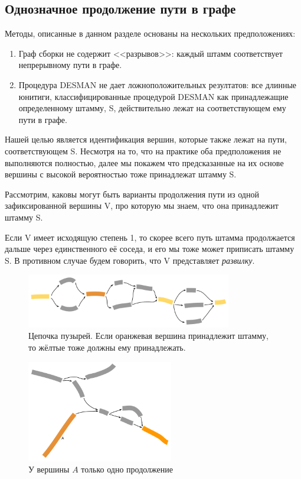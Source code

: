 \documentclass{spbau-diploma}
\begin{document}
\subsection{Однозначное продолжение пути в графе}
Методы, описанные в данном разделе основаны на нескольких предположениях: 
\begin{enumerate}
    \item Граф сборки не содержит <<разрывов>>: каждый штамм соответствует непрерывному пути в графе.
    \item Процедура DESMAN не дает ложноположительных резултатов: все длинные юнитиги, классифицированные процедурой DESMAN как принадлежащие определенному штамму, S, действительно лежат на соответствующем ему пути в графе. 
\end{enumerate}

Нашей целью является идентификация вершин, которые также лежат на пути, соответствующем S. Несмотря на то, что на практике оба предположения не выполняются полностью, далее мы покажем что предсказанные на их основе вершины с высокой вероятностью тоже принадлежат штамму S.

Рассмотрим, каковы могут быть варианты продолжения пути из одной зафиксированной вершины V, про которую мы знаем, что она принадлежит штамму S.

Если V имеет исходящую степень 1, то скорее всего путь штамма продолжается дальше через единственного её соседа, и его мы тоже может приписать штамму S.
В противном случае будем говорить, что V представляет \textit{развилку}.


\begin{figure}[t]
\centering
\includegraphics[width=0.8\textwidth]{pics/bubbles_chain.png}
\caption{Цепочка пузырей. Если оранжевая вершина принадлежит штамму, то жёлтые тоже должны ему принадлежать.}
\label{bubbles_chain}
\end{figure}


\begin{figure}[t]
\centering
\includegraphics[width=0.57\textwidth]{pics/one_continue.png}
\caption{У вершины $A$ только одно продолжение}
\label{one_continue}
\end{figure}
\end{document}
